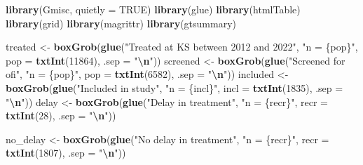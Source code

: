 \documentclass[
]{article}
\newenvironment{Shaded}{\begin{snugshade}}{\end{snugshade}}
\newcommand{\AttributeTok}[1]{\textcolor[rgb]{0.13,0.29,0.53}{#1}}
\newcommand{\ConstantTok}[1]{\textcolor[rgb]{0.56,0.35,0.01}{#1}}
\newcommand{\DecValTok}[1]{\textcolor[rgb]{0.00,0.00,0.81}{#1}}
\newcommand{\FunctionTok}[1]{\textcolor[rgb]{0.13,0.29,0.53}{\textbf{#1}}}
\newcommand{\NormalTok}[1]{#1}
\newcommand{\OtherTok}[1]{\textcolor[rgb]{0.56,0.35,0.01}{#1}}
\newcommand{\SpecialCharTok}[1]{\textcolor[rgb]{0.81,0.36,0.00}{\textbf{#1}}}
\newcommand{\StringTok}[1]{\textcolor[rgb]{0.31,0.60,0.02}{#1}}
\begin{document}
\begin{Shaded}
\begin{Highlighting}[]
\FunctionTok{library}\NormalTok{(Gmisc, }\AttributeTok{quietly =} \ConstantTok{TRUE}\NormalTok{)}
\FunctionTok{library}\NormalTok{(glue)}
\FunctionTok{library}\NormalTok{(htmlTable)}
\FunctionTok{library}\NormalTok{(grid)}
\FunctionTok{library}\NormalTok{(magrittr)}
\FunctionTok{library}\NormalTok{(gtsummary)}

\NormalTok{treated }\OtherTok{\textless{}{-}} \FunctionTok{boxGrob}\NormalTok{(}\FunctionTok{glue}\NormalTok{(}\StringTok{"Treated at KS between 2012 and 2022"}\NormalTok{,}
                           \StringTok{"n = \{pop\}"}\NormalTok{,}
                           \AttributeTok{pop =} \FunctionTok{txtInt}\NormalTok{(}\DecValTok{11864}\NormalTok{),}
                           \AttributeTok{.sep =} \StringTok{"}\SpecialCharTok{\textbackslash{}n}\StringTok{"}\NormalTok{))}
\NormalTok{screened }\OtherTok{\textless{}{-}} \FunctionTok{boxGrob}\NormalTok{(}\FunctionTok{glue}\NormalTok{(}\StringTok{"Screened for ofi"}\NormalTok{,}
                         \StringTok{"n = \{pop\}"}\NormalTok{,}
                         \AttributeTok{pop =} \FunctionTok{txtInt}\NormalTok{(}\DecValTok{6582}\NormalTok{),}
                         \AttributeTok{.sep =} \StringTok{"}\SpecialCharTok{\textbackslash{}n}\StringTok{"}\NormalTok{))}
\NormalTok{included }\OtherTok{\textless{}{-}} \FunctionTok{boxGrob}\NormalTok{(}\FunctionTok{glue}\NormalTok{(}\StringTok{"Included in study"}\NormalTok{,}
                         \StringTok{"n = \{incl\}"}\NormalTok{,}
                         \AttributeTok{incl =} \FunctionTok{txtInt}\NormalTok{(}\DecValTok{1835}\NormalTok{),}
                         \AttributeTok{.sep =} \StringTok{"}\SpecialCharTok{\textbackslash{}n}\StringTok{"}\NormalTok{))}
\NormalTok{delay }\OtherTok{\textless{}{-}} \FunctionTok{boxGrob}\NormalTok{(}\FunctionTok{glue}\NormalTok{(}\StringTok{"Delay in treatment"}\NormalTok{,}
                      \StringTok{"n = \{recr\}"}\NormalTok{,}
                      \AttributeTok{recr =} \FunctionTok{txtInt}\NormalTok{(}\DecValTok{28}\NormalTok{),}
                      \AttributeTok{.sep =} \StringTok{"}\SpecialCharTok{\textbackslash{}n}\StringTok{"}\NormalTok{))}

\NormalTok{no\_delay }\OtherTok{\textless{}{-}} \FunctionTok{boxGrob}\NormalTok{(}\FunctionTok{glue}\NormalTok{(}\StringTok{"No delay in treatment"}\NormalTok{,}
                      \StringTok{"n = \{recr\}"}\NormalTok{,}
                      \AttributeTok{recr =} \FunctionTok{txtInt}\NormalTok{(}\DecValTok{1807}\NormalTok{),}
                      \AttributeTok{.sep =} \StringTok{"}\SpecialCharTok{\textbackslash{}n}\StringTok{"}\NormalTok{))}


\end{Highlighting}
\end{Shaded}
\end{document}

